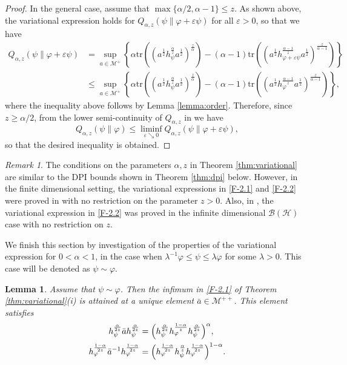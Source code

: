 \documentclass[12pt]{article}
\newtheorem{lemma}[theorem]{Lemma}
\theoremstyle{definition}
\theoremstyle{remark}
\newtheorem{remark}[theorem]{Remark}
\numberwithin{equation}{section}
\def\Me{\mathcal M}
\def\Tr{\mathrm{tr}}
\def\ffi{\varphi}
\begin{document}
\begin{proof}
In the general case, assume that $\max\{\alpha/2,\alpha-1\}\le z$. As shown above,
the variational expression holds for $Q_{\alpha,z}(\psi\|\varphi+\varepsilon\psi)$ for all
$\varepsilon>0$, so that we have
\begin{align*}
Q_{\alpha,z}(\psi\|\varphi+\varepsilon\psi)&=\sup_{a\in \Me^+} \left\{\alpha
\Tr\left((a^{\frac12}h_\psi^{\frac{\alpha}{z}}a^{\frac12})^{\frac{z}{\alpha}}\right)
-(\alpha-1)\Tr\left((a^{\frac12}h_{\varphi+\varepsilon \psi}^{\frac{\alpha-1}{z}}
a^{\frac12})^{\frac{z}{\alpha-1}}\right)\right\}\\
&\le\sup_{a\in \Me^+} \left\{\alpha
\Tr\left((a^{\frac12}h_\psi^{\frac{\alpha}{z}}a^{\frac12})^{\frac{z}{\alpha}}\right)-(\alpha-1)
\Tr\left((a^{\frac12}h_\varphi^{\frac{\alpha-1}{z}}a^{\frac12})^{\frac{z}{\alpha-1}}\right)
\right\},
\end{align*}
where the inequality above follows by Lemma \ref{lemma:order}. Therefore,
since $z\ge\alpha/2$, from the lower semi-continuity of $Q_{\alpha,z}$ in
\cite[Theorem 2(iv)]{kato2023onrenyi} we have
\[
Q_{\alpha,z}(\psi\|\varphi)\le \liminf_{\varepsilon\searrow 0}
Q_{\alpha,z}(\psi\|\varphi+\varepsilon \psi),
\]
so that the desired inequality is obtained.
\end{proof}

{\color{blue}
\begin{remark}\label{remark:variational}
The conditions on the parameters $\alpha,z$ in Theorem \ref{thm:variational} are similar to the DPI
bounds shown in Theorem \ref{thm:dpi} below. However, in the finite dimensional setting, the variational
expressions in \eqref{F-2.1} and \eqref{F-2.2} were proved in \cite[Theorem 3.3]{zhang2020fromwyd}
with no restriction on the parameter $z>0$. Also, in \cite[Lemma 3.23]{mosonyi2023thestrong}, the
variational expression in \eqref{F-2.2} was proved in the infinite dimensional $\mathcal{B}(\mathcal{H})$
case with no restriction on $z$.
\end{remark}}

\medskip
We finish this section by investigation of the properties of the variational expression for
$0<\alpha<1$, in the case when $\lambda^{-1}\ffi\le \psi\le \lambda \ffi$ for some
$\lambda>0$. This case will be denoted as $\psi\sim \ffi$. 

\begin{lemma}\label{lemma:variational_majorized}
Assume that $\psi\sim\ffi$. Then the infimum in \eqref{F-2.1} of Theorem \ref{thm:variational}(i) is
attained at a unique element $\bar a\in \Me^{++}$. This element satisfies
\begin{align}
h_\psi^{\alpha\over2z}\bar ah_\psi^{\alpha\over2z}
&=\Bigl(h_\psi^{\alpha\over2z}h_\ffi^{1-\alpha\over z}h_\psi^{\alpha\over2z}\Bigr)^\alpha,
\label{eq:minimizer1}\\
h_\ffi^{1-\alpha\over2z}\bar a^{-1}h_\ffi^{1-\alpha\over2z}
&=\Bigl(h_\ffi^{1-\alpha\over2z}h_\psi^{\alpha\over
z}h_\ffi^{1-\alpha\over2z}\Bigr)^{1-\alpha}.
\label{eq:minimizer2}
\end{align}
\end{lemma}
\end{document}
